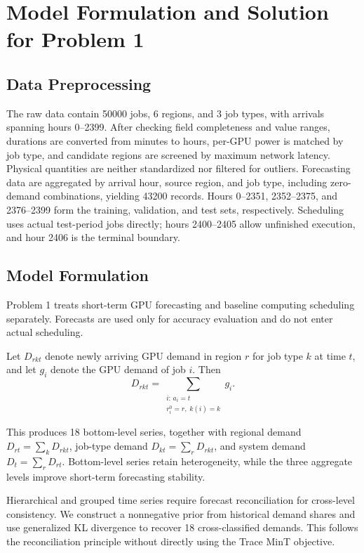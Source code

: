 \section{Model Formulation and Solution for Problem 1}

\subsection{Data Preprocessing}

The raw data contain 50000 jobs, 6 regions, and 3 job types, with arrivals spanning hours 0--2399. After checking field completeness and value ranges, durations are converted from minutes to hours, per-GPU power is matched by job type, and candidate regions are screened by maximum network latency. Physical quantities are neither standardized nor filtered for outliers. Forecasting data are aggregated by arrival hour, source region, and job type, including zero-demand combinations, yielding 43200 records. Hours 0--2351, 2352--2375, and 2376--2399 form the training, validation, and test sets, respectively. Scheduling uses actual test-period jobs directly; hours 2400--2405 allow unfinished execution, and hour 2406 is the terminal boundary.


\subsection{Model Formulation}

Problem 1 treats short-term GPU forecasting and baseline computing scheduling separately. Forecasts are used only for accuracy evaluation and do not enter actual scheduling.

Let $D_{rkt}$ denote newly arriving GPU demand in region $r$ for job type $k$ at time $t$,
and let $g_i$ denote the GPU demand of job $i$. Then
\begin{equation}
	D_{rkt}
	=
	\sum_{\substack{i:\,a_i=t\\
			r_i^0=r,\;k(i)=k}}
	g_i .
	\label{eq:q1_demand}
\end{equation}

This produces 18 bottom-level series, together with regional demand $D_{rt}=\sum_kD_{rkt}$, job-type demand $D_{kt}=\sum_rD_{rkt}$, and system demand $D_t=\sum_rD_{rt}$. Bottom-level series retain heterogeneity, while the three aggregate levels improve short-term forecasting stability.

Hierarchical and grouped time series require forecast reconciliation for cross-level consistency\cite{ref4}. We construct a nonnegative prior from historical demand shares and use generalized KL divergence to recover 18 cross-classified demands. This follows the reconciliation principle without directly using the Trace MinT objective.

